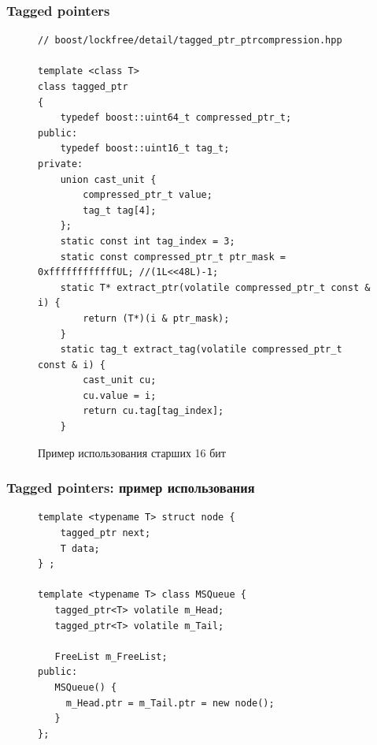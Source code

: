 \documentclass[aspectratio=169, pdf, 8pt, unicode]{beamer}
\begin{document}
\begin{frame}[fragile]
\frametitle{Tagged pointers}
\begin{figure}[H]
\centering
\begin{minipage}{0.8\textwidth}
\small
\begin{verbatim}
// boost/lockfree/detail/tagged_ptr_ptrcompression.hpp

template <class T>
class tagged_ptr
{
    typedef boost::uint64_t compressed_ptr_t;
public:
    typedef boost::uint16_t tag_t;
private:
    union cast_unit {
        compressed_ptr_t value;
        tag_t tag[4];
    };
    static const int tag_index = 3;
    static const compressed_ptr_t ptr_mask = 0xffffffffffffUL; //(1L<<48L)-1;
    static T* extract_ptr(volatile compressed_ptr_t const & i) {
        return (T*)(i & ptr_mask);
    }
    static tag_t extract_tag(volatile compressed_ptr_t const & i) {
        cast_unit cu;
        cu.value = i;
        return cu.tag[tag_index];
    }
\end{verbatim}
\end{minipage}%
\caption{Пример использования старших 16 бит}
\end{figure}
\end{frame}

\begin{frame}[fragile]
\frametitle{Tagged pointers: пример использования}
\begin{figure}[H]
\centering
\begin{minipage}{0.8\textwidth}
\small
\begin{verbatim}
template <typename T> struct node {
    tagged_ptr next;
    T data;
} ;

template <typename T> class MSQueue {
   tagged_ptr<T> volatile m_Head;
   tagged_ptr<T> volatile m_Tail;

   FreeList m_FreeList;
public:
   MSQueue() {
     m_Head.ptr = m_Tail.ptr = new node();
   }
};
\end{verbatim}
\end{minipage}%
\end{figure}
\end{frame}
\end{document}
